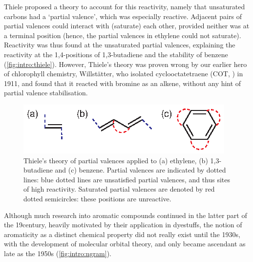 		Thiele proposed a theory to account for this reactivity, namely that unsaturated carbons had a `partial valence', which was especially reactive.\autocite{Thiele1899} Adjacent pairs of partial valences could interact with (saturate) each other, provided neither was at a terminal position (hence, the partial valences in ethylene could not saturate). Reactivity was thus found at the unsaturated partial valences, explaining the reactivity at the 1,4-positions of 1,3-butadiene and the stability of benzene (\autoref{fig:intro:thiele}). However, Thiele's theory was proven wrong by our earlier hero of chlorophyll chemistry, Willst\"atter, who isolated cyclooctatetraene (COT, ) in 1911,\autocite{Willstatter1911} and found that it reacted with bromine as an alkene, without any hint of partial valence stabilisation.

		\begin{figure}[ht!]
			\centering\includegraphics{figures/intro/thiele-valence.eps} 
			\caption[]{Thiele's theory of partial valences applied to (a) ethylene, (b) 1,3-butadiene and (c) benzene. Partial valences are indicated by dotted lines: blue dotted lines are unsatisfied partial valences, and thus sites of high reactivity. Saturated partial valences are denoted by red dotted semicircles: these positions are unreactive.}
			\label{fig:intro:thiele}
		\end{figure}

		Although much research into aromatic compounds continued in the latter part of the 19\nth century, heavily motivated by their application in dyestuffs, the notion of aromaticity as a distinct chemical property did not really exist until the 1930s, with the development of molecular orbital theory, and only became ascendant as late as the 1950s (\autoref{fig:intro:ngram}). %


